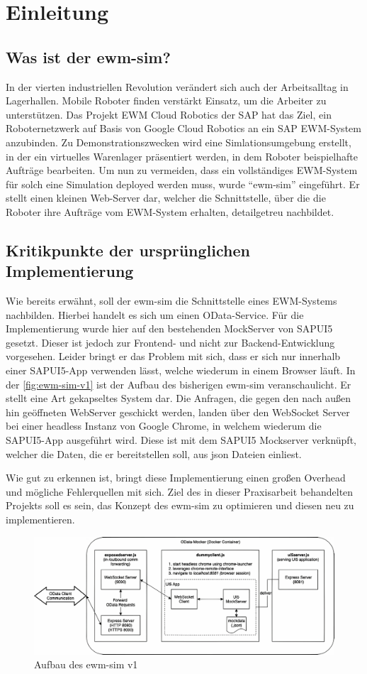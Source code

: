 \chapter{Einleitung}

\section{Was ist der ewm-sim?}
In der vierten industriellen Revolution verändert sich auch der Arbeitsalltag in Lagerhallen. Mobile Roboter finden verstärkt Einsatz, um die Arbeiter zu unterstützen. Das Projekt \ac{EWM} Cloud Robotics der SAP hat das Ziel, ein Roboternetzwerk auf Basis von Google Cloud Robotics an ein SAP \ac{EWM}-System anzubinden. Zu Demonstrationszwecken wird eine Simlationsumgebung erstellt, in der ein virtuelles Warenlager präsentiert werden, in dem Roboter beispielhafte Aufträge bearbeiten. Um nun zu vermeiden, dass ein vollständiges \ac{EWM}-System für solch eine Simulation deployed werden muss, wurde \enquote{ewm-sim} eingeführt. Er stellt einen kleinen Web-Server dar, welcher die Schnittstelle, über die die Roboter ihre Aufträge vom \ac{EWM}-System erhalten, detailgetreu nachbildet.

\section{Kritikpunkte der ursprünglichen Implementierung}
Wie bereits erwähnt, soll der ewm-sim die Schnittstelle eines \ac{EWM}-Systems nachbilden. Hierbei handelt es sich um einen OData-Service. Für die Implementierung wurde hier auf den bestehenden MockServer von SAPUI5 gesetzt. Dieser ist jedoch zur Frontend- und nicht zur Backend-Entwicklung vorgesehen. Leider bringt er das Problem mit sich, dass er sich nur innerhalb einer SAPUI5-App verwenden lässt, welche wiederum in einem Browser läuft. In der \autoref{fig:ewm-sim-v1} ist der Aufbau des bisherigen ewm-sim veranschaulicht. Er stellt eine Art gekapseltes System dar. Die Anfragen, die gegen den nach außen hin geöffneten WebServer geschickt werden, landen über den WebSocket Server bei einer headless Instanz von Google Chrome, in welchem wiederum die SAPUI5-App ausgeführt wird. Diese ist mit dem SAPUI5 Mockserver verknüpft, welcher die Daten, die er bereitstellen soll, aus json Dateien einliest.

Wie gut zu erkennen ist, bringt diese Implementierung einen großen Overhead und mögliche Fehlerquellen mit sich. Ziel des in dieser Praxisarbeit behandelten Projekts soll es sein, das Konzept des ewm-sim zu optimieren und diesen neu zu implementieren.

\begin{figure}
    \centering
    \includegraphics[width=\textwidth]{Bilder/ewm-sim_v1_4x.pdf}
    \caption{Aufbau des ewm-sim v1}
    \label{fig:ewm-sim-v1}
\end{figure}